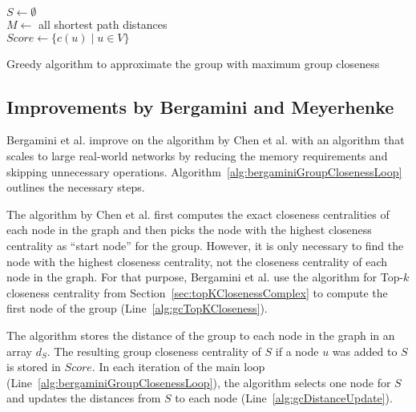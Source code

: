 \begin{algorithm2e}[h!]
  \label{alg:chenGroupCloseness}
 
  $S \gets \emptyset$ \\
  $M \gets $ all shortest path distances \\
  $Score \gets \{c(u) \mid u \in V\}$ \label{alg:initScore} \\
  \caption{Greedy algorithm to approximate the group with maximum group closeness}
\end{algorithm2e}

\subsection{Improvements by Bergamini and Meyerhenke}
Bergamini et al. improve on the algorithm by Chen et al. with an algorithm that scales to large real-world networks by reducing the memory requirements and skipping unnecessary operations. Algorithm~\ref{alg:bergaminiGroupClosenessLoop} outlines the necessary steps.

The algorithm by Chen et al. first computes the exact closeness centralities of each node in the graph and then picks the node with the highest closeness centrality as ``start node'' for the group. However, it is only necessary to find the node with the highest closeness centrality, not the closeness centrality of each node in the graph. For that purpose, Bergamini et al. use the algorithm for Top-$k$ closeness centrality from Section~\ref{sec:topKClosenessComplex} to compute the first node of the group (Line~\ref{alg:gcTopKCloseness}).

The algorithm stores the distance of the group to each node in the graph in an array $d_S$. The resulting group closeness centrality of $S$ if a node $u$ was added to $S$ is stored in $Score$. In each iteration of the main loop (Line~\ref{alg:bergaminiGroupClosenessLoop}), the algorithm selects one node for $S$ and updates the distances from $S$ to each node (Line~\ref{alg:gcDistanceUpdate}).

